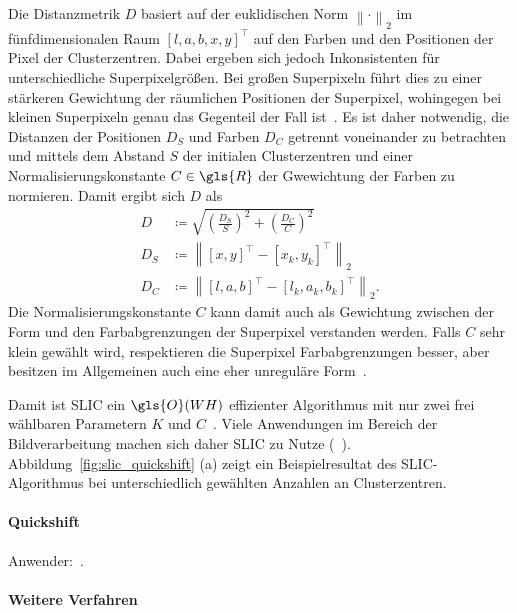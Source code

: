 Die Distanzmetrik $D$ basiert auf der euklidischen Norm ${\left\|\cdot\right\|}_2$ im fünfdimensionalen Raum ${\left[l,a,b,x,y\right]}^{\top}$ auf den Farben und den Positionen der Pixel \bzw{} der Clusterzentren.
Dabei ergeben sich jedoch Inkonsistenten für unterschiedliche Superpixelgrößen.
Bei großen Superpixeln führt dies zu einer stärkeren Gewichtung der räumlichen Positionen der Superpixel, wohingegen bei kleinen Superpixeln genau das Gegenteil der Fall ist~\cite{slic}.
Es ist daher notwendig, die Distanzen der Positionen $D_S$ und Farben $D_C$ getrennt voneinander zu betrachten und mittels dem Abstand $S$ der initialen Clusterzentren und einer Normalisierungskonstante $C \in \gls{R}$ \bzgl{} der Gwewichtung der Farben zu normieren.
Damit ergibt sich $D$ als~\cite{slic}
\begin{equation*}
\begin{split}
  D & \coloneqq \sqrt{{\left(\frac{D_S}{S}\right)}^2 + {\left(\frac{D_C}{C}\right)}^2}\\
  D_S & \coloneqq {\left\|{\left[x, y\right]}^{\top} - {\left[x_k, y_k\right]}^{\top}\right\|}_2\\
  D_C & \coloneqq {\left\|{\left[l, a, b\right]}^{\top} - {\left[l_k, a_k, b_k\right]}^{\top}\right\|}_2.
\end{split}
\end{equation*}
Die Normalisierungskonstante $C$ kann damit auch als Gewichtung zwischen der Form und den Farbabgrenzungen der Superpixel verstanden werden.
Falls $C$ sehr klein gewählt wird, respektieren die Superpixel Farbabgrenzungen besser, aber besitzen im Allgemeinen auch eine eher unreguläre Form~\cite{slic}.

Damit ist \gls{SLIC} ein $\gls{O}\left(WH\right)$ effizienter Algorithmus mit nur zwei frei wählbaren Parametern $K$ und $C$~\cite{slic}.
Viele Anwendungen im Bereich der Bildverarbeitung machen sich daher \gls{SLIC} zu Nutze (\vgl{}~\cite{Gadde, supercnn, super}).
Abbildung~\ref{fig:slic_quickshift} (a) zeigt ein Beispielresultat des \gls{SLIC}-Algorithmus bei unterschiedlich gewählten Anzahlen an Clusterzentren.



\paragraph{Quickshift}
\label{quickshift}

\cite{quickshift}
Anwender:~\cite{Fulkerson}.

\paragraph{Weitere Verfahren}
\label{weitere_superpixel_verfahren}

